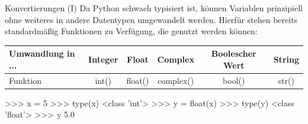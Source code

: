          
        \begin{frame}[fragile]{Konvertierungen (I)}
            Da Python schwach typisiert ist, können Variablen prinzipiell ohne weiteres in andere Datentypen umgewandelt werden. Hierfür stehen bereits standardmäßig Funktionen zu Verfügung, die genutzt werden können:
            
            \begin{table}[]
                \begin{tabular}{|l|c|c|c|c|c|}
                    \hline
                    \rowcolor[HTML]{EFEFEF} 
                    Umwandlung in ...                & Integer & Float   & Complex   & Boolescher Wert & String \\ \hline
                    \cellcolor[HTML]{EFEFEF}Funktion & int()   & float() & complex() & bool()          & str()  \\ \hline
                \end{tabular}
            \end{table}
            
\begin{pyconcode}
>>> x = 5
>>> type(x)
<class 'int'>
>>> y = float(x)
>>> type(y)
<class 'float'>
>>> y
5.0
\end{pyconcode}
        \end{frame}
    
